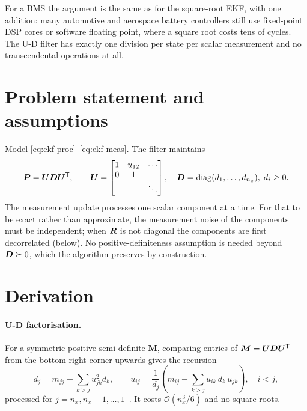 For a BMS the argument is the same as for the square-root EKF, with one addition: many
automotive and aerospace battery controllers still use fixed-point DSP cores or software
floating point, where a square root costs tens of cycles. The U-D filter has exactly one
division per state per scalar measurement and no transcendental operations at all.

\section{Problem statement and assumptions}
Model \eqref{eq:ekf-proc}--\eqref{eq:ekf-meas}. The filter maintains
\begin{equation}
\bm{P} = \bm{U}\bm{D}\bm{U}^{\mathsf{T}}, \qquad
\bm{U} = \begin{bmatrix}1 & u_{12} & \cdots\\ 0 & 1 & \\ & & \ddots\end{bmatrix},\quad
\bm{D} = \operatorname{diag}(d_1,\dots,d_{n_x}),\; d_i\ge0 .
\label{eq:ud-def}
\end{equation}
The measurement update processes one scalar component at a time. For that to be exact rather
than approximate, the measurement noise of the components must be independent; when $\bm{R}$ is
not diagonal the components are first decorrelated (below). No positive-definiteness
assumption is needed beyond $\bm{D}\succeq0$, which the algorithm preserves by construction.

\section{Derivation}
\paragraph{U-D factorisation.} For a symmetric positive semi-definite $\bm{M}$, comparing
entries of $\bm{M} = \bm{U}\bm{D}\bm{U}^{\mathsf{T}}$ from the bottom-right corner upwards gives the recursion
\begin{equation}
d_j = m_{jj} - \sum_{k>j} u_{jk}^2 d_k, \qquad
u_{ij} = \frac{1}{d_j}\left(m_{ij} - \sum_{k>j} u_{ik}\,d_k\,u_{jk}\right), \quad i<j,
\label{eq:ud-factor}
\end{equation}
processed for $j = n_x, n_x-1,\dots,1$~\cite[App.~III]{bierman1977}. It costs
$\mathcal{O}(n_x^3/6)$ and no square roots.

